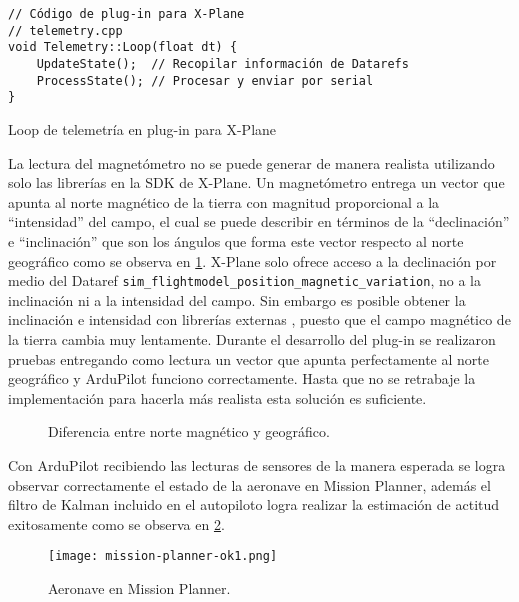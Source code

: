 \begin{listing}[h]
    \begin{verbatim}
// Código de plug-in para X-Plane
// telemetry.cpp
void Telemetry::Loop(float dt) {
    UpdateState();  // Recopilar información de Datarefs
    ProcessState(); // Procesar y enviar por serial
}
    \end{verbatim}
    \caption{Loop de telemetría en plug-in para X-Plane}
    \label{lst:telemetry-loop}
\end{listing}

La lectura del magnetómetro no se puede generar de manera realista utilizando solo las librerías en la SDK de X-Plane. Un magnetómetro entrega un vector que apunta al norte magnético de la tierra con magnitud proporcional a la ``intensidad'' del campo, el cual se puede describir en términos de la ``declinación'' e ``inclinación'' que son los ángulos que forma este vector respecto al norte geográfico como se observa en \cref{fig:magnetic-geographic-north}. X-Plane solo ofrece acceso a la declinación por medio del Dataref \texttt{sim\_flightmodel\_position\_magnetic\_variation}, no a la inclinación ni a la intensidad del campo. Sin embargo es posible obtener la inclinación e intensidad con librerías externas \cite{geomag}, puesto que el campo magnético de la tierra cambia muy lentamente. Durante el desarrollo del plug-in se realizaron pruebas entregando como lectura un vector que apunta perfectamente al norte geográfico y ArduPilot funciono correctamente. Hasta que no se retrabaje la implementación para hacerla más realista esta solución es suficiente.

\begin{figure}[h]
    \centering
    
    \caption[Diferencia entre norte magnético y geográfico.]{Diferencia entre norte magnético y geográfico.\footnotemark}
    \label{fig:magnetic-geographic-north}
\end{figure}

Con ArduPilot recibiendo las lecturas de sensores de la manera esperada se logra observar correctamente el estado de la aeronave en Mission Planner, además el filtro de Kalman incluido en el autopiloto logra realizar la estimación de actitud exitosamente como se observa en \cref{fig:mission-planner-ok1}.

\begin{figure}[h]
    \centering
    \texttt{[image: mission-planner-ok1.png]}
    \caption{Aeronave en Mission Planner.}
    \label{fig:mission-planner-ok1}
\end{figure}

